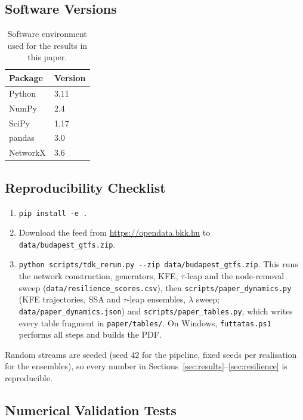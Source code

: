 \documentclass[12pt,a4paper]{article}
\theoremstyle{plain}
\theoremstyle{definition}
\theoremstyle{remark}
\begin{document}
\subsection{Software Versions}

\begin{table}[htbp]
\centering
\small
\begin{tabular}{ll}
\toprule
Package & Version \\
\midrule
Python    & 3.11 \\
NumPy     & 2.4 \\
SciPy     & 1.17 \\
pandas    & 3.0 \\
NetworkX  & 3.6 \\
\bottomrule
\end{tabular}
\caption{Software environment used for the results in this paper.}
\end{table}

\subsection{Reproducibility Checklist}

\begin{enumerate}
  \item \texttt{pip install -e .}
  \item Download the feed from \url{https://opendata.bkk.hu} to
    \texttt{data/budapest\_gtfs.zip}.
  \item \texttt{python scripts/tdk\_rerun.py -{}-zip data/budapest\_gtfs.zip}.
    This runs the network construction, generators, KFE, $\tau$-leap and the
    node-removal sweep (\texttt{data/resilience\_scores.csv}), then
    \texttt{scripts/paper\_dynamics.py} (KFE trajectories, SSA and $\tau$-leap
    ensembles, $\lambda$ sweep; \texttt{data/paper\_dynamics.json}) and
    \texttt{scripts/paper\_tables.py}, which writes every table fragment in
    \texttt{paper/tables/}.  On Windows, \texttt{futtatas.ps1} performs all
    steps and builds the PDF.
\end{enumerate}
Random streams are seeded (seed 42 for the pipeline, fixed seeds per
realisation for the ensembles), so every number in
Sections~\ref{sec:results}--\ref{sec:resilience} is reproducible.


\subsection{Numerical Validation Tests}
\label{app:tests}
\end{document}

